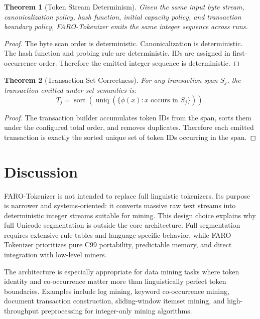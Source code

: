 \documentclass[11pt,a4paper]{article}
\newtheorem{theorem}{Theorem}
\newcommand{\uniq}{\operatorname{uniq}}
\newcommand{\sort}{\operatorname{sort}}
\begin{document}
\begin{theorem}[Token Stream Determinism]
Given the same input byte stream, canonicalization policy, hash function, initial capacity policy, and transaction boundary policy, FARO-Tokenizer emits the same integer sequence across runs.
\end{theorem}

\begin{proof}
The byte scan order is deterministic. Canonicalization is deterministic. The hash function and probing rule are deterministic. IDs are assigned in first-occurrence order. Therefore the emitted integer sequence is deterministic.
\end{proof}

\begin{theorem}[Transaction Set Correctness]
For any transaction span \(S_j\), the transaction emitted under set semantics is:
\[
T_j=\sort(\uniq(\{\phi(x):x\text{ occurs in }S_j\})).
\]
\end{theorem}

\begin{proof}
The transaction builder accumulates token IDs from the span, sorts them under the configured total order, and removes duplicates. Therefore each emitted transaction is exactly the sorted unique set of token IDs occurring in the span.
\end{proof}

\section{Discussion}

FARO-Tokenizer is not intended to replace full linguistic tokenizers. Its purpose is narrower and systems-oriented: it converts massive raw text streams into deterministic integer streams suitable for mining. This design choice explains why full Unicode segmentation is outside the core architecture. Full segmentation requires extensive rule tables and language-specific behavior, while FARO-Tokenizer prioritizes pure C99 portability, predictable memory, and direct integration with low-level miners.

The architecture is especially appropriate for data mining tasks where token identity and co-occurrence matter more than linguistically perfect token boundaries. Examples include log mining, keyword co-occurrence mining, document transaction construction, sliding-window itemset mining, and high-throughput preprocessing for integer-only mining algorithms.
\end{document}
